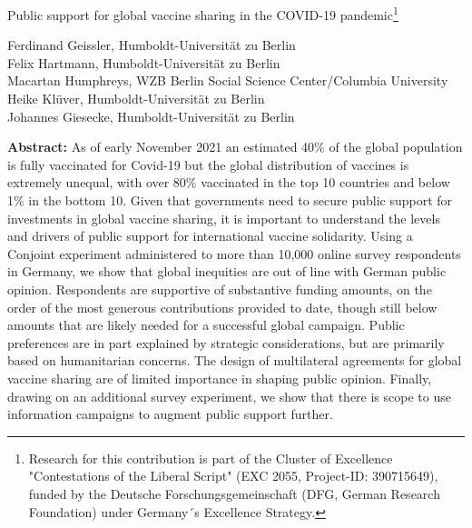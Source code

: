 \documentclass[12pt,oneside]{article}
\begin{document}

\setlength{\textwidth}{14.0cm}

\onehalfspacing

\vspace*{0.7cm}
\begin{center}
\begin{huge}
Public support for global vaccine sharing in the COVID-19 pandemic\footnote{Research for this contribution is part of the Cluster of Excellence "Contestations of the Liberal Script" (EXC 2055, Project-ID: 390715649), funded by the Deutsche Forschungsgemeinschaft (DFG, German Research Foundation) under Germany´s Excellence Strategy.}
\end{huge}
\end{center}

\vspace*{0.5cm}

\begin{center}
Ferdinand Geissler, Humboldt-Universität zu Berlin \\
Felix Hartmann, Humboldt-Universität zu Berlin \\ 
Macartan Humphreys, WZB Berlin Social Science Center/Columbia University \\
Heike Klüver, Humboldt-Universität zu Berlin \\
Johannes Giesecke, Humboldt-Universität zu Berlin



\end{center}		
		
\vspace*{1cm}
										
					
\singlespacing

\textbf{Abstract:} 
\normal
As of early November 2021 an estimated 40\% of the global population is fully vaccinated for Covid-19 but the global distribution of vaccines is extremely unequal, with over 80\% vaccinated in the top 10 countries and below 1\% in the bottom 10. Given that governments need to secure public support for investments in global vaccine sharing, it is important to understand the levels and drivers of public support for international vaccine solidarity. Using a  Conjoint experiment administered to more than 10,000 online survey respondents in Germany, we show that global inequities are out of line with German public opinion. Respondents are supportive of substantive funding amounts, on the order of the most generous contributions provided to date, though still below amounts that are likely needed for a successful global campaign. Public preferences are in part explained by strategic considerations, but are primarily based on humanitarian concerns. The design of multilateral agreements for global vaccine sharing are of limited importance in shaping public opinion. Finally, drawing on an additional survey experiment, we show that there is scope to use information campaigns to augment public support further.   
\end{document}
